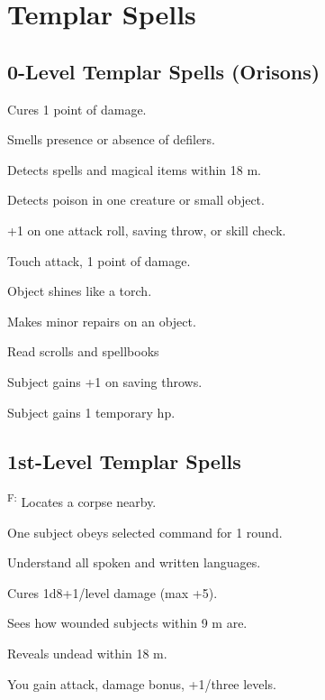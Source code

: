 \section{Templar Spells}



\subsection{0-Level Templar Spells (Orisons)}

 Cures 1 point of damage.

 Smells presence or absence of defilers.

 Detects spells and magical items within 18 m.

 Detects poison in one creature or small object.

 +1 on one attack roll, saving throw, or skill check.

 Touch attack, 1 point of damage.

 Object shines like a torch.

 Makes minor repairs on an object.

 Read scrolls and spellbooks

 Subject gains +1 on saving throws.

 Subject gains 1 temporary hp.



\subsection{1st-Level Templar Spells}

\textsuperscript{F:} Locates a corpse nearby.

 One subject obeys selected command for 1 round.

 Understand all spoken and written languages.

 Cures 1d8+1/level damage (max +5).

 Sees how wounded subjects within 9 m are.

 Reveals undead within 18 m.

 You gain attack, damage bonus, +1/three levels.

